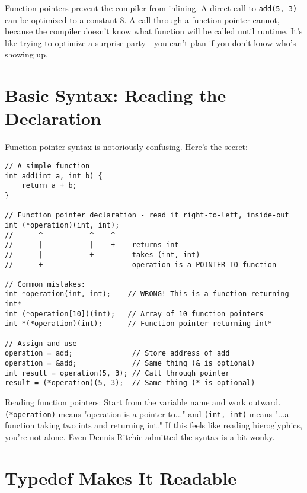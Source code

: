 \begin{notebox}
Function pointers prevent the compiler from inlining. A direct call to \texttt{add(5, 3)} can be optimized to a constant 8. A call through a function pointer cannot, because the compiler doesn't know what function will be called until runtime. It's like trying to optimize a surprise party—you can't plan if you don't know who's showing up.
\end{notebox}

\section{Basic Syntax: Reading the Declaration}

Function pointer syntax is notoriously confusing. Here's the secret:

\begin{lstlisting}
// A simple function
int add(int a, int b) {
    return a + b;
}

// Function pointer declaration - read it right-to-left, inside-out
int (*operation)(int, int);
//      ^           ^    ^
//      |           |    +--- returns int
//      |           +-------- takes (int, int)
//      +-------------------- operation is a POINTER TO function

// Common mistakes:
int *operation(int, int);    // WRONG! This is a function returning int*
int (*operation[10])(int);   // Array of 10 function pointers
int *(*operation)(int);      // Function pointer returning int*

// Assign and use
operation = add;              // Store address of add
operation = &add;             // Same thing (& is optional)
int result = operation(5, 3); // Call through pointer
result = (*operation)(5, 3);  // Same thing (* is optional)
\end{lstlisting}

\begin{notebox}
Reading function pointers: Start from the variable name and work outward. \texttt{(*operation)} means "operation is a pointer to..." and \texttt{(int, int)} means "...a function taking two ints and returning int." If this feels like reading hieroglyphics, you're not alone. Even Dennis Ritchie admitted the syntax is a bit wonky.
\end{notebox}

\section{Typedef Makes It Readable}

